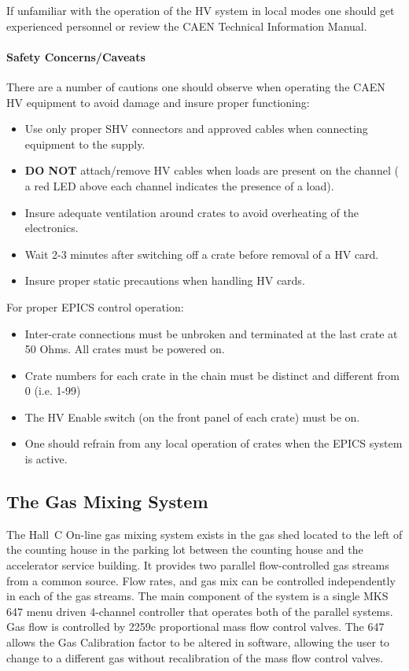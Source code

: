 If unfamiliar with the operation of the HV system in local modes
one should get experienced personnel or review the CAEN Technical
Information Manual.

\paragraph{Safety Concerns/Caveats}

There are a number of cautions one should observe when operating
the CAEN HV equipment to avoid damage and insure proper functioning:

\begin{itemize}
\item{Use only proper SHV connectors and approved cables when
connecting equipment to the supply.}
\item{{\bf DO NOT} attach/remove HV cables when loads are present on the
channel ( a red LED above each channel indicates the presence of a
load).}
\item{Insure adequate ventilation around crates to avoid overheating
of the electronics.}
\item{Wait 2-3 minutes after switching off a crate before removal of a
HV card.}
\item{Insure proper static precautions when handling HV cards.}
\end{itemize}

For proper EPICS control operation:

\begin{itemize}
\item{Inter-crate connections must be unbroken and terminated at the
last crate at 50 Ohms.  All crates must be powered on.}
\item{Crate numbers for each crate in the chain must be distinct and
different from 0 (i.e. 1-99)}
\item{The HV Enable switch (on the front panel of each crate) must be on.}
\item{One should refrain from any local operation of crates when the
EPICS system is active.}
\end{itemize}

\subsection{The Gas Mixing System}

The Hall~C On-line gas mixing system exists in the gas shed located
to the left of the counting house in the parking lot between the counting house
and the accelerator service building.
It provides two parallel
flow-controlled gas streams from a common source.  Flow rates, and gas mix
can be controlled independently in each of the gas streams.  The main
component of the system is a single MKS 647 menu driven 4-channel
controller that operates both of the parallel systems.  Gas flow is
controlled by 2259c proportional mass flow control valves.  The 647 allows
the Gas Calibration factor to be altered in software, allowing the user to
change to a different gas without recalibration of the mass flow control
valves.

